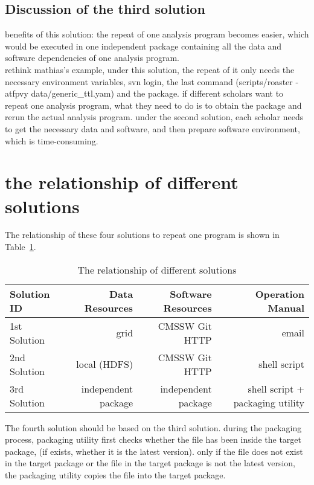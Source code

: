 \documentclass{article}
\begin{document}
\subsection{Discussion of the third solution}
\indent benefits of this solution: the repeat of one analysis program becomes easier, which would be executed in one independent package containing all the data and software dependencies of one analysis program. \\

rethink mathias’s example, under this solution, the repeat of it only needs the necessary environment variables, svn login,  the last command (scripts/roaster -atfpvy data/generic\_ttl.yam) and the package. if different scholars want to repeat one analysis program, what they need to do is to obtain the package and rerun the actual analysis program. under the second solution, each scholar needs to get the necessary data and software, and then prepare software environment, which is time-consuming. \\

\section{the relationship of different solutions}
\indent The relationship of these four solutions to repeat one program is shown in Table~\ref{table:relationship}.\\

\begin{table}
    \centering
    \begin{tabular}{|l|r|r|r|}
        \hline
        Solution ID & Data Resources & Software Resources & Operation Manual \\ \hline
        1st Solution & grid & CMSSW Git HTTP & email \\ \hline
        2nd Solution & local (HDFS) & CMSSW Git HTTP & shell script \\ \hline
        3rd Solution & independent package & independent package & shell script + packaging utility \\ \hline
    \end{tabular}
    \caption{The relationship of different solutions}
    \label{table:relationship}
\end{table}

The fourth solution should be based on the third solution. during the packaging process, packaging utility first checks whether the file has been inside the target package, (if exists, whether it is the latest version). only if the file does not exist in the target package or the file in the target package is not the latest version, the packaging utility copies the file into the target package.\\
\end{document}

